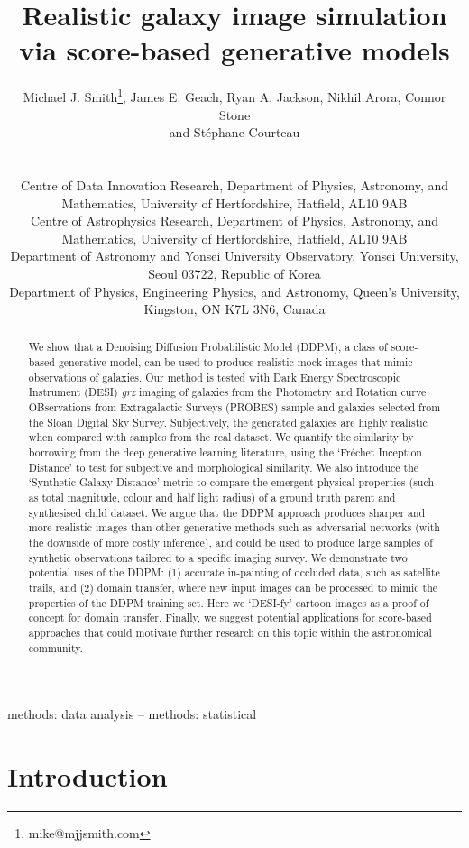 \documentclass[fleqn,usenatbib]{mnras}
\title[Score-based modelling]{Realistic galaxy image simulation via score-based generative models}
\author[M. J. Smith et al.]
{\parbox{\textwidth}{
Michael J. Smith\thanks{mike@mjjsmith.com},
James E. Geach,
Ryan A. Jackson,
Nikhil Arora,
Connor Stone \\ and
St\'ephane Courteau}\\\\
Centre of Data Innovation Research, Department of Physics, Astronomy, and Mathematics, University of Hertfordshire, Hatfield, AL10 9AB\\
Centre of Astrophysics Research, Department of Physics, Astronomy, and Mathematics, University of Hertfordshire, Hatfield, AL10 9AB\\
Department of Astronomy and Yonsei University Observatory, Yonsei University, Seoul 03722, Republic of Korea\\
Department of Physics, Engineering Physics, and Astronomy, Queen’s University, Kingston, ON K7L 3N6, Canada
}
\begin{document}
\label{firstpage}
\pagerange{\pageref{firstpage}--\pageref{lastpage}}
\maketitle

\begin{abstract}
    We show that a Denoising Diffusion Probabilistic Model (DDPM), a class of
    score-based generative model, can be used to produce realistic mock
    images that mimic observations of galaxies. Our method is tested with Dark
    Energy Spectroscopic Instrument (DESI) {\it grz} imaging of galaxies from the
    Photometry and Rotation curve OBservations from Extragalactic Surveys
    (PROBES) sample and galaxies selected from the Sloan Digital Sky Survey.
    Subjectively, the generated galaxies are highly realistic when compared
    with samples from the real dataset. We quantify the similarity by
    borrowing from the deep generative learning literature, using the
    `Fr\'{e}chet Inception Distance' to test for subjective and morphological
    similarity. We also introduce the `Synthetic Galaxy Distance' metric
    to compare the emergent physical properties (such as total magnitude,
    colour and half light radius) of a ground truth parent and synthesised
    child dataset. We argue that the DDPM approach produces sharper and more
    realistic images than other generative methods such as adversarial networks
    (with the downside of more costly inference), and could be used to produce
    large samples of synthetic observations tailored to a specific imaging
    survey. We demonstrate two potential uses of the DDPM: (1) accurate
    in-painting of occluded data, such as satellite trails, and (2) domain
    transfer, where new input images can be processed to mimic the properties
    of the DDPM training set.  Here we `DESI-fy' cartoon images as a proof of
    concept for domain transfer.  Finally, we suggest potential applications
    for score-based approaches that could motivate further research on this
    topic within the astronomical community.
\end{abstract}

\begin{keywords}
    methods: data analysis -- methods: statistical
\end{keywords}





\section{Introduction}
\end{document}
